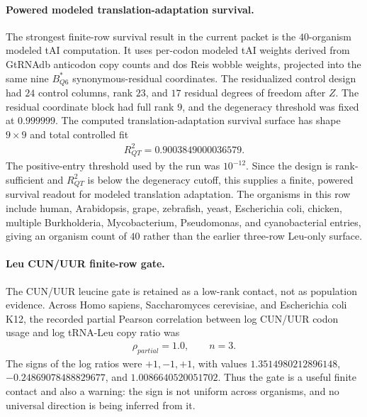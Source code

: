 \paragraph{Powered modeled translation-adaptation survival.}
The strongest finite-row survival result in the current packet is the $40$-organism modeled tAI computation.  It uses per-codon modeled tAI weights derived from GtRNAdb anticodon copy counts and dos Reis wobble weights, projected into the same nine $B^*_{Q6}$ synonymous-residual coordinates.  The residualized control design had $24$ control columns, rank $23$, and $17$ residual degrees of freedom after $Z$.  The residual coordinate block had full rank $9$, and the degeneracy threshold was fixed at $0.999999$.  The computed translation-adaptation survival surface has shape $9 \times 9$ and total controlled fit
$$
\begin{aligned}
R^2_{QT} = 0.9003849000036579.
\end{aligned}
$$
The positive-entry threshold used by the run was $10^{-12}$.  Since the design is rank-sufficient and $R^2_{QT}$ is below the degeneracy cutoff, this supplies a finite, powered survival readout for modeled translation adaptation.  The organisms in this row include human, Arabidopsis, grape, zebrafish, yeast, Escherichia coli, chicken, multiple Burkholderia, Mycobacterium, Pseudomonas, and cyanobacterial entries, giving an organism count of $40$ rather than the earlier three-row Leu-only surface.

\paragraph{Leu CUN/UUR finite-row gate.}
The CUN/UUR leucine gate is retained as a low-rank contact, not as population evidence.  Across Homo sapiens, Saccharomyces cerevisiae, and Escherichia coli K12, the recorded partial Pearson correlation between log CUN/UUR codon usage and log tRNA-Leu copy ratio was
$$
\begin{aligned}
\rho_{partial} = 1.0, \qquad n = 3.
\end{aligned}
$$
The signs of the log ratios were $+1,-1,+1$, with values $1.3514980212896148$, $-0.24869078488829677$, and $1.0086640520051702$.  Thus the gate is a useful finite contact and also a warning: the sign is not uniform across organisms, and no universal direction is being inferred from it.

